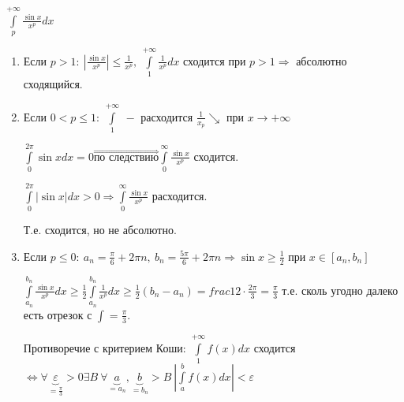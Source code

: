 \begin{example}
    $\int\limits_p^{+\infty}\frac{\sin x}{x^p}dx$

    \begin{enumerate}
        \item Если $p>1:\ |\frac{\sin x}{x^p}|\leq \frac{1}{x^p},\ \int\limits_1^{+\infty}\frac{1}{x^p}dx$ сходится при $p>1\Rightarrow$ абсолютно сходящийся.
        \item Если $0<p\leq 1:\ \int\limits_1^{+\infty}\ -$ расходится $\frac{1}{x_p}\searrow$ при $x\rightarrow +\infty$

        $\int\limits_0^{2\pi}\sin xdx=0\overset{\Rightarrow}{\text{по следствию}}\int\limits_0^{\infty}\frac{\sin x}{x^p}$ сходится.

        $\int\limits_0^{2\pi}|\sin x|dx>0\Rightarrow\int\limits_0^{\infty}\frac{\sin x}{x^p}$ расходится.

        Т.е. сходится, но не абсолютно.
        \item Если $p\leq 0:\ a_n=\frac{\pi}{6}+2\pi n,\ b_n=\frac{5\pi}{6}+2\pi n\Rightarrow \sin x\geq \frac{1}{2}$ при $x\in[a_n, b_n]$

        $\int\limits_{a_n}^{b_n}\frac{\sin x}{x^p}dx\geq \frac{1}{2}\int\limits_{a_n}^{b_n}\frac{1}{x^p}dx\geq \frac{1}{2}(b_n-a_n)=frac{1}{2}\cdot \frac{2\pi}{3}=\frac{\pi}{3}$ т.е. сколь угодно далеко есть отрезок с $\int=\frac{\pi}{3}$.

        Противоречие с критерием Коши: $\int\limits_1^{+\infty}f(x)dx$ сходится $\Leftrightarrow \forall \underbrace{\varepsilon}_{=\frac{\pi}{3}} >0\exists B\ \forall \underbrace{a}_{=a_n},\underbrace{b}_{=b_n}>B\ |\int\limits_a^b f(x)dx|<\varepsilon$
    \end{enumerate}
\end{example}